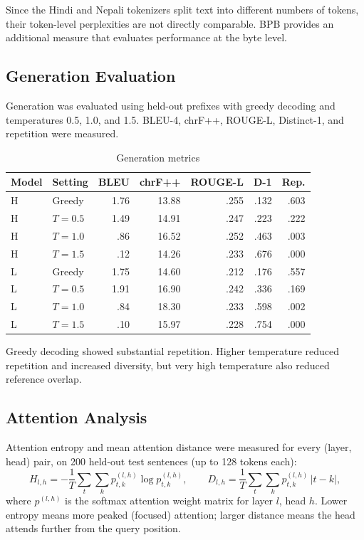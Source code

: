 \documentclass[10pt,a4paper]{article}
\begin{document}
Since the Hindi and Nepali tokenizers split text into different numbers of tokens, their token-level perplexities are not directly comparable. BPB provides an additional measure that evaluates performance at the byte level.

\subsection{Generation Evaluation}
Generation was evaluated using held-out prefixes with greedy decoding
and temperatures 0.5, 1.0, and 1.5. BLEU-4, chrF++, ROUGE-L,
Distinct-1, and repetition were measured.

\begin{table}[H]\centering
\caption{Generation metrics}
\scriptsize
\begin{tabular}{llrrrrr}\toprule
Model & Setting & BLEU & chrF++ & ROUGE-L & D-1 & Rep.\\\midrule
H & Greedy & 1.76 & 13.88 & .255 & .132 & .603\\
H & $T=0.5$ & 1.49 & 14.91 & .247 & .223 & .222\\
H & $T=1.0$ & .86 & 16.52 & .252 & .463 & .003\\
H & $T=1.5$ & .12 & 14.26 & .233 & .676 & .000\\
L & Greedy & 1.75 & 14.60 & .212 & .176 & .557\\
L & $T=0.5$ & 1.91 & 16.90 & .242 & .336 & .169\\
L & $T=1.0$ & .84 & 18.30 & .233 & .598 & .002\\
L & $T=1.5$ & .10 & 15.97 & .228 & .754 & .000\\
\bottomrule\end{tabular}
\end{table}

Greedy decoding showed substantial repetition. Higher temperature
reduced repetition and increased diversity, but very high temperature
also reduced reference overlap.

\subsection{Attention Analysis}
Attention entropy and mean attention distance were measured for every
(layer, head) pair, on 200 held-out test sentences (up to 128 tokens each):
\[
H_{l,h}=-\frac{1}{T}\sum_t\sum_k
p_{t,k}^{(l,h)}\log p_{t,k}^{(l,h)},
\qquad
D_{l,h}=\frac{1}{T}\sum_t\sum_k
p_{t,k}^{(l,h)}\,|t-k|,
\]
where $p^{(l,h)}$ is the softmax attention weight matrix for layer $l$, head
$h$. Lower entropy means more peaked (focused) attention; larger distance
means the head attends further from the query position.
\end{document}
